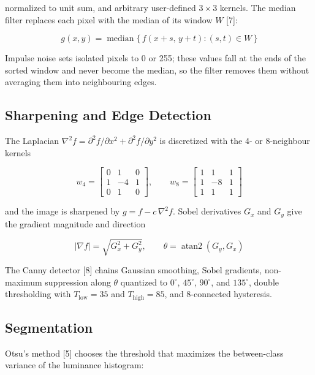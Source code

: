 \documentclass[journal]{IEEEtran}
\begin{document}
normalized to unit sum, and arbitrary user-defined $3\times3$ kernels. The median filter replaces each pixel with the median of its window $W$ [7]:

\begin{equation}
  g(x, y) = \operatorname{median}\{\, f(x+s,\, y+t) : (s, t) \in W \,\}
  \label{eq:median}
\end{equation}

Impulse noise sets isolated pixels to 0 or 255; these values fall at the ends of the sorted window and never become the median, so the filter removes them without averaging them into neighbouring edges.

\subsection{Sharpening and Edge Detection}
The Laplacian $\nabla^2 f = \partial^2 f/\partial x^2 + \partial^2 f/\partial y^2$ is discretized with the 4- or 8-neighbour kernels

\begin{equation}
  w_4 = \begin{bmatrix} 0 & 1 & 0 \\ 1 & -4 & 1 \\ 0 & 1 & 0 \end{bmatrix}, \qquad w_8 = \begin{bmatrix} 1 & 1 & 1 \\ 1 & -8 & 1 \\ 1 & 1 & 1 \end{bmatrix}
  \label{eq:lap}
\end{equation}

and the image is sharpened by $g = f - c\,\nabla^2 f$. Sobel derivatives $G_x$ and $G_y$ give the gradient magnitude and direction

\begin{equation}
  |\nabla f| = \sqrt{G_x^{2} + G_y^{2}}, \qquad \theta = \operatorname{atan2}(G_y, G_x)
  \label{eq:sobel}
\end{equation}

The Canny detector [8] chains Gaussian smoothing, Sobel gradients, non-maximum suppression along $\theta$ quantized to $0^{\circ}$, $45^{\circ}$, $90^{\circ}$, and $135^{\circ}$, double thresholding with $T_{\mathrm{low}}=35$ and $T_{\mathrm{high}}=85$, and 8-connected hysteresis.

\subsection{Segmentation}
Otsu's method [5] chooses the threshold that maximizes the between-class variance of the luminance histogram:
\end{document}
